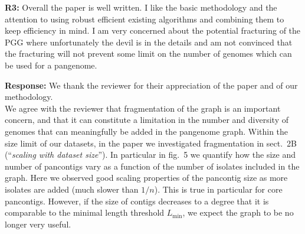 \documentclass[aps,rmp,onecolumn]{revtex4-1}
\newcommand{\Lthr}{L_{\min}}
\newcommand{\Marco}[1]{{\color{orange}Marco: #1}}
\newcommand{\reviewer}[2]{\textbf{#1:} #2\vskip 5mm}
\newcommand{\response}[1]{{\it {\color{response}\textbf{Response:} #1}}\vskip 5mm}
\begin{document}
\reviewer{R3}{Overall the paper is well written. I like the basic methodology and the attention to using robust efficient existing algorithms and combining them to keep efficiency in mind. I am very concerned about the potential fracturing of the PGG where unfortunately the devil is in the details and am not convinced that the fracturing will not prevent some limit on the number of genomes which can be used for a pangenome.}
\response{
      We thank the reviewer for their appreciation of the paper and of our methodology.\\
      We agree with the reviewer that fragmentation of the graph is an important concern, and that it can constitute a limitation in the number and diversity of genomes that can meaningfully be added in the pangenome graph. 
      Within the size limit of our datasets, in the paper we investigated fragmentation in sect.~2B (``\textit{scaling with dataset size}''). 
      In particular in fig.~5 we quantify how the size and number of pancontigs vary as a function of the number of isolates included in the graph. 
      Here we observed good scaling properties of the pancontig size as more isolates are added (much slower than $1/n$).
      This is true in particular for core pancontigs. 
      However, if the size of contigs decreases to a degree that it is comparable to the minimal length threshold $\Lthr$, we expect the graph to be no longer very useful.     
      
}
\end{document}
